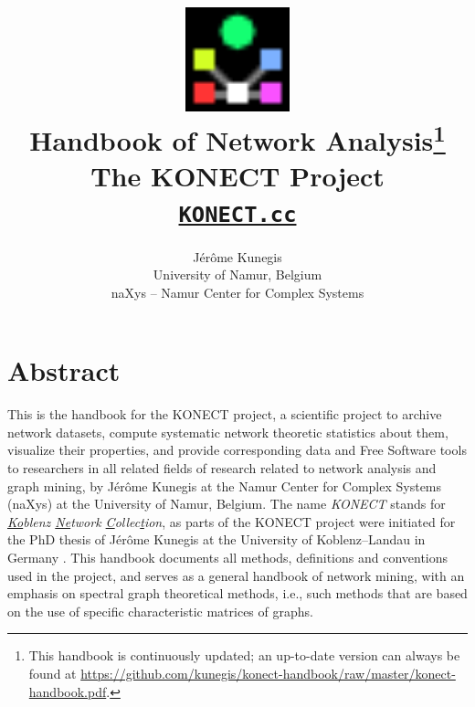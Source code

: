 \documentclass{article}
\begin{document}
\title{
  \includegraphics[width=3cm]{konect-logo} \\
  \vspace{1cm}
         {\Huge Handbook of Network Analysis\footnote{This handbook is
             continuously updated; an up-to-date version can always be found at
         \href{https://github.com/kunegis/konect-handbook/raw/master/konect-handbook.pdf}{https://github.com/kunegis/konect-handbook/raw/master/konect-handbook.pdf}.}} \\
         The KONECT Project \\
         \texttt{\href{http://KONECT.cc/}{KONECT.cc}}
}

\author{
  Jérôme Kunegis \\
  University of Namur, Belgium \\
  naXys -- Namur Center for Complex Systems 
}

\maketitle

\section*{Abstract}
This is the handbook for the KONECT project, a scientific project to
archive network datasets, compute systematic network theoretic
statistics about them, visualize their properties, and provide
corresponding data and Free Software tools to researchers in all related
fields of research related to network analysis and graph mining, by
Jérôme Kunegis at the Namur Center for Complex Systems (naXys) at the
University of Namur, Belgium.  The name \emph{KONECT} stands for
\emph{\underline{Ko}blenz \underline{Ne}twork \underline{C}ollec\underline{t}ion}, as parts of the KONECT project
were initiated for the PhD thesis of Jérôme Kunegis at
the University of Koblenz--Landau in Germany \citeyearpar{kunegis:phd}.  This handbook
documents all methods, definitions and conventions used in the project,
and serves as a general handbook of network mining, with an emphasis on
spectral graph theoretical methods, i.e., such methods that are based on
the use of specific characteristic matrices of graphs. 
\end{document}
